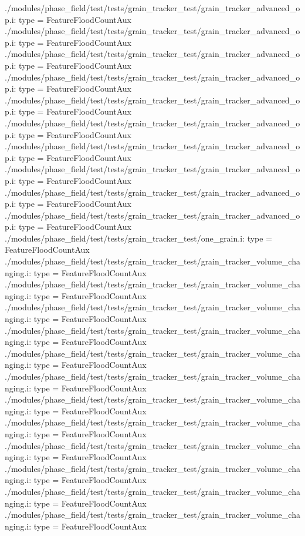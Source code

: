 ./modules/phase_field/test/tests/grain_tracker_test/grain_tracker_advanced_op.i:    type = FeatureFloodCountAux
./modules/phase_field/test/tests/grain_tracker_test/grain_tracker_advanced_op.i:    type = FeatureFloodCountAux
./modules/phase_field/test/tests/grain_tracker_test/grain_tracker_advanced_op.i:    type = FeatureFloodCountAux
./modules/phase_field/test/tests/grain_tracker_test/grain_tracker_advanced_op.i:    type = FeatureFloodCountAux
./modules/phase_field/test/tests/grain_tracker_test/grain_tracker_advanced_op.i:    type = FeatureFloodCountAux
./modules/phase_field/test/tests/grain_tracker_test/grain_tracker_advanced_op.i:    type = FeatureFloodCountAux
./modules/phase_field/test/tests/grain_tracker_test/grain_tracker_advanced_op.i:    type = FeatureFloodCountAux
./modules/phase_field/test/tests/grain_tracker_test/grain_tracker_advanced_op.i:    type = FeatureFloodCountAux
./modules/phase_field/test/tests/grain_tracker_test/grain_tracker_advanced_op.i:    type = FeatureFloodCountAux
./modules/phase_field/test/tests/grain_tracker_test/grain_tracker_advanced_op.i:    type = FeatureFloodCountAux
./modules/phase_field/test/tests/grain_tracker_test/one_grain.i:    type = FeatureFloodCountAux
./modules/phase_field/test/tests/grain_tracker_test/grain_tracker_volume_changing.i:    type = FeatureFloodCountAux
./modules/phase_field/test/tests/grain_tracker_test/grain_tracker_volume_changing.i:    type = FeatureFloodCountAux
./modules/phase_field/test/tests/grain_tracker_test/grain_tracker_volume_changing.i:    type = FeatureFloodCountAux
./modules/phase_field/test/tests/grain_tracker_test/grain_tracker_volume_changing.i:    type = FeatureFloodCountAux
./modules/phase_field/test/tests/grain_tracker_test/grain_tracker_volume_changing.i:    type = FeatureFloodCountAux
./modules/phase_field/test/tests/grain_tracker_test/grain_tracker_volume_changing.i:    type = FeatureFloodCountAux
./modules/phase_field/test/tests/grain_tracker_test/grain_tracker_volume_changing.i:    type = FeatureFloodCountAux
./modules/phase_field/test/tests/grain_tracker_test/grain_tracker_volume_changing.i:    type = FeatureFloodCountAux
./modules/phase_field/test/tests/grain_tracker_test/grain_tracker_volume_changing.i:    type = FeatureFloodCountAux
./modules/phase_field/test/tests/grain_tracker_test/grain_tracker_volume_changing.i:    type = FeatureFloodCountAux
./modules/phase_field/test/tests/grain_tracker_test/grain_tracker_volume_changing.i:    type = FeatureFloodCountAux
./modules/phase_field/test/tests/grain_tracker_test/grain_tracker_volume_changing.i:    type = FeatureFloodCountAux
